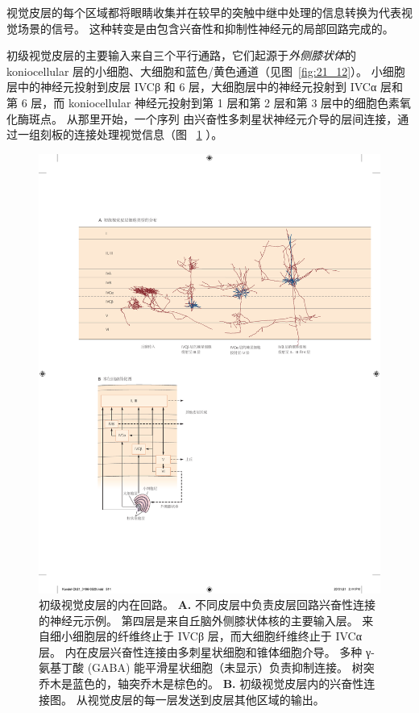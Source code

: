 视觉皮层的每个区域都将眼睛收集并在较早的突触中继中处理的信息转换为代表视觉场景的信号。
这种转变是由包含兴奋性和抑制性神经元的局部回路完成的。


初级视觉皮层的主要输入来自三个平行通路，它们起源于\textit{外侧膝状体}的 koniocellular 层的小细胞、大细胞和蓝色/黄色通道（见图~\ref{fig:21_12}）。
小细胞层中的神经元投射到皮层 IVCβ 和 6 层，大细胞层中的神经元投射到 IVCα 层和第 6 层，而 koniocellular 神经元投射到第 1 层和第 2 层和第 3 层中的细胞色素氧化酶斑点。
从那里开始，一个序列 由兴奋性多刺星状神经元介导的层间连接，通过一组刻板的连接处理视觉信息（图 ~\ref{fig:21_15} ）。


\begin{figure}[htbp]
	\centering
	\includegraphics[width=1.0\linewidth]{chap21/fig_21_15}
	\caption{初级视觉皮层的内在回路。 
		\textbf{A.} 不同皮层中负责皮层回路兴奋性连接的神经元示例。 
		第四层是来自丘脑外侧膝状体核的主要输入层。 
		来自细小细胞层的纤维终止于 IVCβ 层，而大细胞纤维终止于 IVCα 层。 
		内在皮层兴奋性连接由多刺星状细胞和锥体细胞介导。 
		多种 γ-氨基丁酸 (GABA) 能平滑星状细胞（未显示）负责抑制连接。 
		树突乔木是蓝色的，轴突乔木是棕色的\cite{blasdel1983termination}。
		\textbf{B.} 初级视觉皮层内的兴奋性连接图。
		从视觉皮层的每一层发送到皮层其他区域的输出。}
	\label{fig:21_15}
\end{figure}


